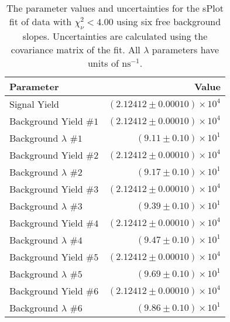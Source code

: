 
\begin{table}[ht]
    \begin{center}
        \begin{tabular}{lr}\toprule
            Parameter & Value \\\midrule
            Signal Yield & $(2.12412 \pm 0.00010) \times 10^{4}$ \\
            Background Yield $\#1$ & $(2.12412 \pm 0.00010) \times 10^{4}$ \\
            Background $\lambda$ $\#1$ & $(9.11 \pm 0.10) \times 10^{1}$ \\
            Background Yield $\#2$ & $(2.12412 \pm 0.00010) \times 10^{4}$ \\
            Background $\lambda$ $\#2$ & $(9.17 \pm 0.10) \times 10^{1}$ \\
            Background Yield $\#3$ & $(2.12412 \pm 0.00010) \times 10^{4}$ \\
            Background $\lambda$ $\#3$ & $(9.39 \pm 0.10) \times 10^{1}$ \\
            Background Yield $\#4$ & $(2.12412 \pm 0.00010) \times 10^{4}$ \\
            Background $\lambda$ $\#4$ & $(9.47 \pm 0.10) \times 10^{1}$ \\
            Background Yield $\#5$ & $(2.12412 \pm 0.00010) \times 10^{4}$ \\
            Background $\lambda$ $\#5$ & $(9.69 \pm 0.10) \times 10^{1}$ \\
            Background Yield $\#6$ & $(2.12412 \pm 0.00010) \times 10^{4}$ \\
            Background $\lambda$ $\#6$ & $(9.86 \pm 0.10) \times 10^{1}$ \\\bottomrule
        \end{tabular}
        \caption{The parameter values and uncertainties for the sPlot fit of data with $\chi^2_\nu < 4.00$ using six free background slopes. Uncertainties are calculated using the covariance matrix of the fit. All $\lambda$ parameters have units of $\si{\nano\second}^{-1}$.}\label{tab:splot-fit-results-chisqdof-4.00-free-6}
    \end{center}
\end{table}
